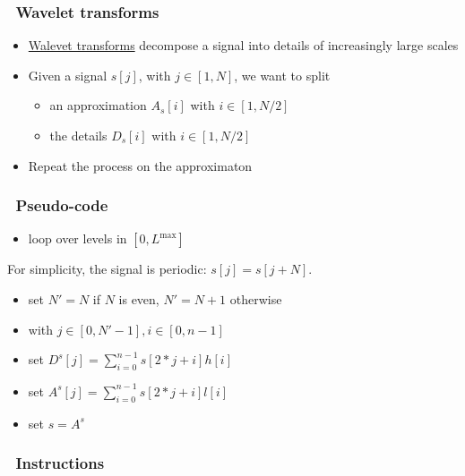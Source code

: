 \subsubsection{~Wavelet transforms}\label{wavelet-transforms}

\begin{itemize}
\item
  \href{http://en.wikipedia.org/wiki/Wavelet_transform}{Walevet
  transforms} decompose a signal into details of increasingly large
  scales
\item
  Given a signal $s[j]$, with $j \in [1, N]$, we want to split

  \begin{itemize}
  \itemsep1pt\parskip0pt
  \item
    an approximation $A_s[i]$ with $i \in [1, N/2]$
  \item
    the details $D_s[i]$ with $i \in [1, N/2]$
  \end{itemize}
\item
  Repeat the process on the approximaton
\end{itemize}

\subsubsection{~Pseudo-code}\label{pseudo-code}

\begin{itemize}
\itemsep1pt\parskip0pt
\item
  loop over levels in $[0, L^\textrm{max}]$
\end{itemize}

For simplicity, the signal is periodic: $s[j] = s[j + N]$.

\begin{itemize}
\itemsep1pt\parskip0pt
\item
  set $N' = N$ if $N$ is even, $N'=N+1$ otherwise
\item
  with $j \in [0, N' - 1], i \in [0, n - 1]$
\item
  set $D^s[j] = \sum_{i=0}^{n - 1} s[2*j + i] h[i]$
\item
  set $A^s[j] = \sum_{i=0}^{n - 1} s[2*j + i] l[i]$
\item
  set $s = A^s$
\end{itemize}

\subsubsection{~Instructions}\label{instructions}


